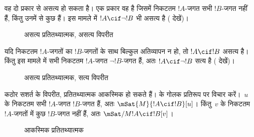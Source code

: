 \documentclass[../../../include/open-logic-section]{subfiles}
\begin{document}
वह दो प्रकार से असत्य हो सकता है। एक प्रकार वह है जिसमें निकटतम $!A$-जगत
सभी $!B$-जगत नहीं हैं, किंतु उनमें से कुछ हैं। इस मामले में
$!A \cif \lnot !B$ भी असत्य है ( देखें)।
\begin{figure}
\begin{center}
\caption{असत्य प्रतितथ्यात्मक, असत्य विपरीत}
\end{center}
\end{figure}
यदि निकटतम $!A$-जगतों का $!B$-जगतों के साथ बिल्कुल अतिव्यापन न हो, तो
$!A \cif !B$ असत्य है। किंतु इस मामले में सभी निकटतम $!A$-जगत
$\lnot !B$-जगत हैं, अतः $!A \cif \lnot !B$ सत्य है
( देखें)।
\begin{figure}
\begin{center}
\caption{असत्य प्रतितथ्यात्मक, सत्य विपरीत}
\end{center}
\end{figure}

कठोर सशर्त के विपरीत, प्रतितथ्यात्मक आकस्मिक हो सकते हैं।
 के गोलक प्रतिरूप पर विचार करें।~$u$ के निकटतम सभी
$!A$-जगत $!B$-जगत हैं, अतः $\mSat{M}{!A \cif !B}[u]$। किंतु~$v$ के
निकटतम $!A$-जगतों में कुछ $!B$-जगत नहीं हैं, अतः
$\mSat/{M}{!A \cif !B}[v]$।
\begin{figure}
\begin{center}
\end{center}
\caption{आकस्मिक प्रतितथ्यात्मक}
\end{figure}
\end{document}
